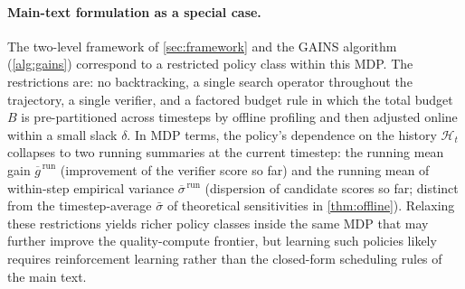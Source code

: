 \paragraph{Main-text formulation as a special case.}
The two-level framework of \cref{sec:framework} and the \textsc{GAINS} algorithm (\cref{alg:gains}) correspond to a restricted policy class within this MDP. The restrictions are: no backtracking, a single search operator throughout the trajectory, a single verifier, and a factored budget rule in which the total budget $B$ is pre-partitioned across timesteps by offline profiling and then adjusted online within a small slack $\delta$. In MDP terms, the policy's dependence on the history $\mathcal{H}_t$ collapses to two running summaries at the current timestep: the running mean gain $\overline{g}^{\,\mathrm{run}}$ (improvement of the verifier score so far) and the running mean of within-step empirical variance $\overline{\sigma}^{\,\mathrm{run}}$ (dispersion of candidate scores so far; distinct from the timestep-average $\bar\sigma$ of theoretical sensitivities in \cref{thm:offline}). Relaxing these restrictions yields richer policy classes inside the same MDP that may further improve the quality-compute frontier, but learning such policies likely requires reinforcement learning rather than the closed-form scheduling rules of the main text.
